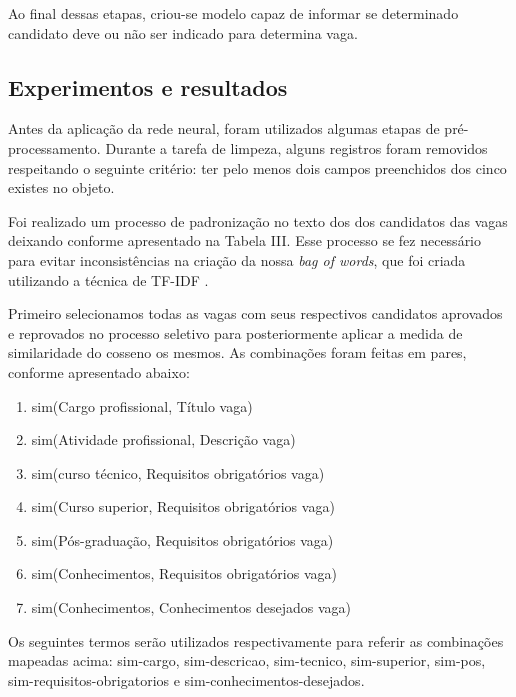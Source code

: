 \documentclass[conference]{IEEEtran}
\begin{document}
Ao final dessas etapas, criou-se modelo capaz de informar se determinado candidato deve ou não ser indicado para determina vaga.

\subsection{Experimentos e resultados}

    Antes da aplicação da rede neural, foram utilizados algumas etapas de pré-processamento. 
    Durante a tarefa de limpeza, alguns registros foram removidos respeitando o seguinte critério: ter pelo menos dois campos preenchidos dos cinco existes no objeto.
    
    Foi realizado um processo de padronização no texto dos dos candidatos das vagas deixando conforme apresentado na Tabela III. Esse processo se fez necessário para evitar inconsistências na criação da nossa \textit{bag of words}, que foi criada utilizando a técnica de TF-IDF \cite{tfidf3}.
    
    Primeiro selecionamos todas as vagas com seus respectivos candidatos aprovados e reprovados no processo seletivo para posteriormente aplicar a medida de similaridade do cosseno os mesmos. As combinações foram feitas em pares, conforme apresentado abaixo:
    
    \begin{enumerate}
    \item sim(Cargo profissional, Título vaga)
    \item sim(Atividade profissional, Descrição vaga)
    \item sim(curso técnico, Requisitos obrigatórios vaga)
    \item sim(Curso superior, Requisitos obrigatórios vaga)
    \item sim(Pós-graduação, Requisitos obrigatórios vaga)
    \item sim(Conhecimentos, Requisitos obrigatórios vaga)
    \item sim(Conhecimentos, Conhecimentos desejados vaga)
    \end{enumerate}

 Os seguintes termos serão utilizados respectivamente para referir as combinações mapeadas acima: sim-cargo, sim-descricao, sim-tecnico, sim-superior, sim-pos, sim-requisitos-obrigatorios e sim-conhecimentos-desejados.
    
\end{document}
